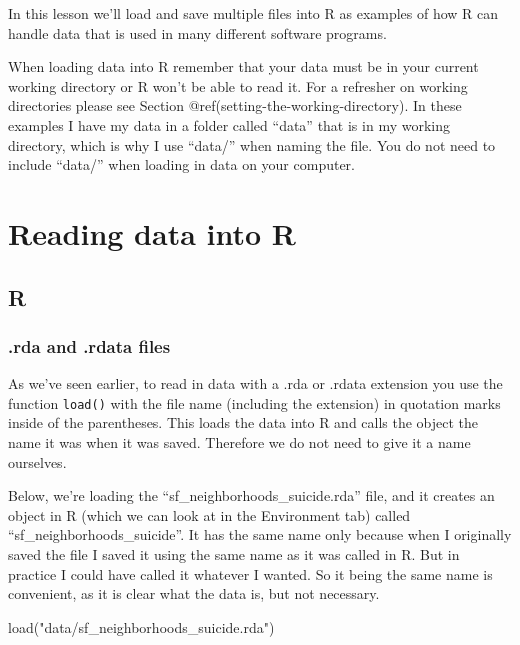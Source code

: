 \documentclass[
  a4paper,
]{krantz}
\makeatletter
\newenvironment{Shaded}{\begin{snugshade}}{\end{snugshade}}
\newcommand{\FunctionTok}[1]{\textcolor[rgb]{0.00,0.00,0.00}{#1}}
\newcommand{\NormalTok}[1]{#1}
\newcommand{\StringTok}[1]{\textcolor[rgb]{0.31,0.60,0.02}{#1}}
\newenvironment{kframe}{%
\medskip{}
\setlength{\fboxsep}{.8em}
 \def\at@end@of@kframe{}%
 \ifinner\ifhmode%
  \def\at@end@of@kframe{\end{minipage}}%
  \begin{minipage}{\columnwidth}%
 \fi\fi%
 \def\FrameCommand##1{\hskip\@totalleftmargin \hskip-\fboxsep
 \colorbox{shadecolor}{##1}\hskip-\fboxsep
     \hskip-\linewidth \hskip-\@totalleftmargin \hskip\columnwidth}%
 \MakeFramed {\advance\hsize-\width
   \@totalleftmargin\z@ \linewidth\hsize
   \@setminipage}}%
 {\par\unskip\endMakeFramed%
 \at@end@of@kframe}
\renewenvironment{Shaded}{\begin{kframe}}{\end{kframe}}
\makeatother
\begin{document}
In this lesson we'll load and save multiple files into R as
examples of how R can handle data that is used in many
different software programs.

When loading data into R remember that your data must be in
your current working directory or R won't be able to read
it. For a refresher on working directories please see
Section @ref(setting-the-working-directory). In these
examples I have my data in a folder called ``data'' that is
in my working directory, which is why I use ``data/'' when
naming the file. You do not need to include ``data/'' when
loading in data on your computer.

\hypertarget{reading-data-into-r-1}{%
\section{Reading data into R}\label{reading-data-into-r-1}}

\hypertarget{r}{%
\subsection{R}\label{r}}

\hypertarget{rda-and-.rdata-files}{%
\subsubsection{.rda and .rdata
files}\label{rda-and-.rdata-files}}

As we've seen earlier, to read in data with a .rda or .rdata
extension you use the function \texttt{load()} with the file
name (including the extension) in quotation marks inside of
the parentheses. This loads the data into R and calls the
object the name it was when it was saved. Therefore we do
not need to give it a name ourselves.

Below, we're loading the ``sf\_neighborhoods\_suicide.rda''
file, and it creates an object in R (which we can look at in
the Environment tab) called ``sf\_neighborhoods\_suicide''.
It has the same name only because when I originally saved
the file I saved it using the same name as it was called in
R. But in practice I could have called it whatever I wanted.
So it being the same name is convenient, as it is clear what
the data is, but not necessary.

\begin{Shaded}
\begin{Highlighting}[]
\FunctionTok{load}\NormalTok{(}\StringTok{"data/sf\_neighborhoods\_suicide.rda"}\NormalTok{)}
\end{Highlighting}
\end{Shaded}
\end{document}
